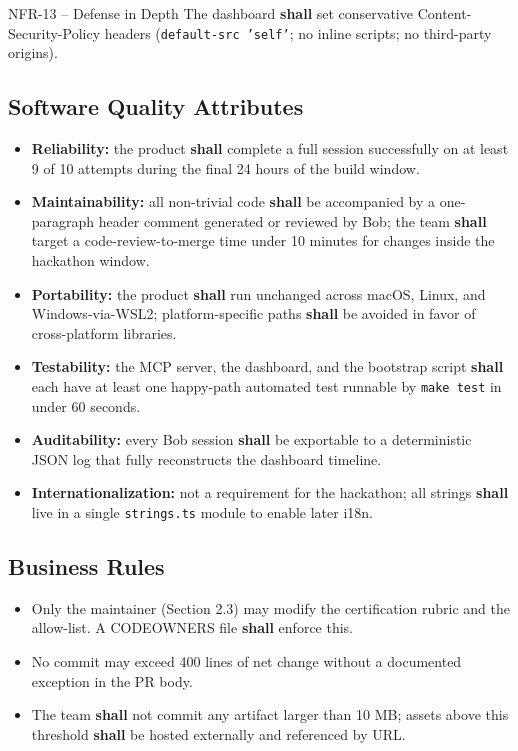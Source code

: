 \documentclass[11pt,letterpaper]{article}
\newcommand{\shall}{\textbf{shall}}
\begin{document}
\begin{reqbox}{NFR-13 -- Defense in Depth}
The dashboard \shall{} set conservative Content-Security-Policy headers (\texttt{default-src 'self'}; no inline scripts; no third-party origins).
\end{reqbox}

\subsection{Software Quality Attributes}

\begin{itemize}
  \item \textbf{Reliability:} the product \shall{} complete a full session successfully on at least 9 of 10 attempts during the final 24 hours of the build window.
  \item \textbf{Maintainability:} all non-trivial code \shall{} be accompanied by a one-paragraph header comment generated or reviewed by Bob; the team \shall{} target a code-review-to-merge time under 10 minutes for changes inside the hackathon window.
  \item \textbf{Portability:} the product \shall{} run unchanged across macOS, Linux, and Windows-via-WSL2; platform-specific paths \shall{} be avoided in favor of cross-platform libraries.
  \item \textbf{Testability:} the MCP server, the dashboard, and the bootstrap script \shall{} each have at least one happy-path automated test runnable by \texttt{make test} in under 60 seconds.
  \item \textbf{Auditability:} every Bob session \shall{} be exportable to a deterministic JSON log that fully reconstructs the dashboard timeline.
  \item \textbf{Internationalization:} not a requirement for the hackathon; all strings \shall{} live in a single \texttt{strings.ts} module to enable later i18n.
\end{itemize}

\subsection{Business Rules}

\begin{itemize}
  \item Only the maintainer (Section 2.3) may modify the certification rubric and the allow-list. A CODEOWNERS file \shall{} enforce this.
  \item No commit may exceed 400 lines of net change without a documented exception in the PR body.
  \item The team \shall{} not commit any artifact larger than 10 MB; assets above this threshold \shall{} be hosted externally and referenced by URL.
\end{itemize}
\end{document}
